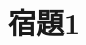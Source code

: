 \documentclass[class=jsarticle, crop=false, dvipdfmx, fleqn]{standalone}
\begin{document}
\section*{宿題1}
\end{document}
